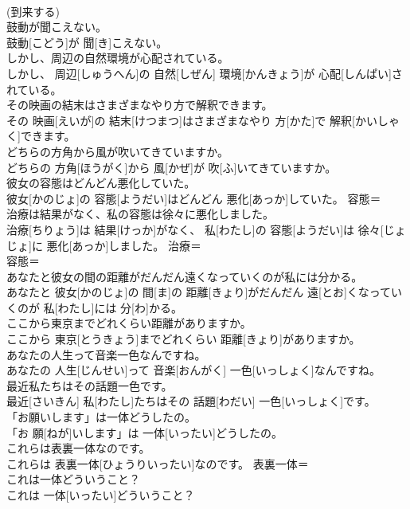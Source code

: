 \documentclass[8pt]{extreport}
\begin{document}
\begin{CJK}{UTF8}{min}
\\	(到来する) 
\\	鼓動が聞こえない。	
\\	鼓動[こどう]が 聞[き]こえない。	
\\	しかし、周辺の自然環境が心配されている。	
\\	しかし、 周辺[しゅうへん]の 自然[しぜん] 環境[かんきょう]が 心配[しんぱい]されている。	
\\	その映画の結末はさまざまなやり方で解釈できます。	
\\	その 映画[えいが]の 結末[けつまつ]はさまざまなやり 方[かた]で 解釈[かいしゃく]できます。	
\\	どちらの方角から風が吹いてきていますか。	
\\	どちらの 方角[ほうがく]から 風[かぜ]が 吹[ふ]いてきていますか。	
\\	彼女の容態はどんどん悪化していた。	
\\	彼女[かのじょ]の 容態[ようだい]はどんどん 悪化[あっか]していた。	容態＝ 
\\	治療は結果がなく、私の容態は徐々に悪化しました。	
\\	治療[ちりょう]は 結果[けっか]がなく、 私[わたし]の 容態[ようだい]は 徐々[じょじょ]に 悪化[あっか]しました。	治療＝ 
\\	容態＝ 
\\	あなたと彼女の間の距離がだんだん遠くなっていくのが私には分かる。	
\\	あなたと 彼女[かのじょ]の 間[ま]の 距離[きょり]がだんだん 遠[とお]くなっていくのが 私[わたし]には 分[わ]かる。	
\\	ここから東京までどれくらい距離がありますか。	
\\	ここから 東京[とうきょう]までどれくらい 距離[きょり]がありますか。	
\\	あなたの人生って音楽一色なんですね。	
\\	あなたの 人生[じんせい]って 音楽[おんがく] 一色[いっしょく]なんですね。	
\\	最近私たちはその話題一色です。	
\\	最近[さいきん] 私[わたし]たちはその 話題[わだい] 一色[いっしょく]です。	
\\	「お願いします」は一体どうしたの。	
\\	「お 願[ねが]いします」は 一体[いったい]どうしたの。	
\\	これらは表裏一体なのです。	
\\	これらは 表裏一体[ひょうりいったい]なのです。	表裏一体＝ 
\\	これは一体どういうこと？	
\\	これは 一体[いったい]どういうこと？	

\end{CJK}
\end{document}
